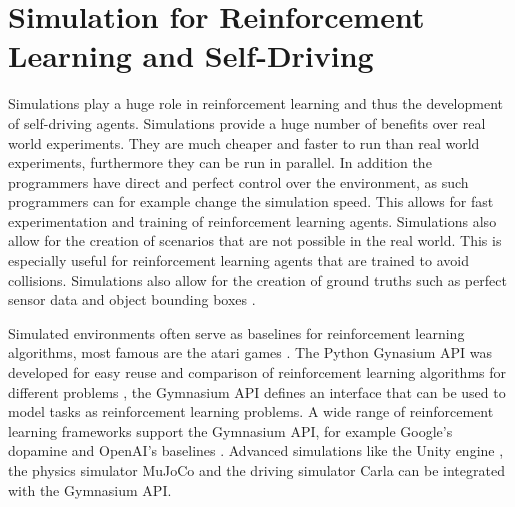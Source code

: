 







\section{Simulation for Reinforcement Learning and Self-Driving}


Simulations play a huge role in reinforcement learning and thus the development of self-driving agents. Simulations provide a huge number of benefits over real world experiments. They are much cheaper and faster to run than real world experiments, furthermore they can be run in parallel. In addition the programmers have direct and perfect control over the environment, as such programmers can for example change the simulation speed. This allows for fast experimentation and training of reinforcement learning agents. Simulations also allow for the creation of scenarios that are not possible in the real world. This is especially useful for reinforcement learning agents that are trained to avoid collisions. Simulations also allow for the creation of ground truths such as perfect sensor data and object bounding boxes \textcite{carla}.

Simulated environments often serve as baselines for reinforcement learning algorithms, most famous are the atari games \textcite{atari}. The Python Gynasium API was developed for easy reuse and comparison of reinforcement learning algorithms for different problems \textcite{gymnasium}, the Gymnasium API defines an interface that can be used to model tasks as reinforcement learning problems. A wide range of reinforcement learning frameworks support the Gymnasium API, for example Google's dopamine \textcite{dopamine} and OpenAI's baselines \textcite{sb3}. Advanced simulations like the Unity engine \textcite{unity}, the physics simulator MuJoCo \textcite{mujoco} and the driving simulator Carla \textcite{carla} can be integrated with the Gymnasium API.


